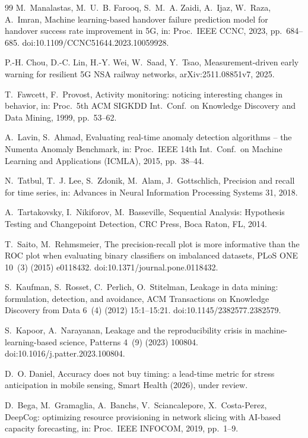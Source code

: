 \documentclass[preprint,review,12pt]{elsarticle}
\begin{document}
\begin{thebibliography}{99}
M.~Manalastas, M.~U.~B. Farooq, S.~M.~A. Zaidi, A.~Ijaz, W.~Raza, A.~Imran, Machine
learning-based handover failure prediction model for handover success rate
improvement in 5G, in: Proc.\ IEEE CCNC, 2023, pp.~684--685.
doi:10.1109/CCNC51644.2023.10059928.

P.-H. Chou, D.-C. Lin, H.-Y. Wei, W.~Saad, Y.~Tsao, Measurement-driven early warning
for resilient 5G NSA railway networks, arXiv:2511.08851v7, 2025.

T.~Fawcett, F.~Provost, Activity monitoring: noticing interesting changes in
behavior, in: Proc.\ 5th ACM SIGKDD Int.\ Conf.\ on Knowledge Discovery and Data
Mining, 1999, pp.~53--62.

A.~Lavin, S.~Ahmad, Evaluating real-time anomaly detection algorithms -- the Numenta
Anomaly Benchmark, in: Proc.\ IEEE 14th Int.\ Conf.\ on Machine Learning and
Applications (ICMLA), 2015, pp.~38--44.

N.~Tatbul, T.~J. Lee, S.~Zdonik, M.~Alam, J.~Gottschlich, Precision and recall for
time series, in: Advances in Neural Information Processing Systems 31, 2018.

A.~Tartakovsky, I.~Nikiforov, M.~Basseville, Sequential Analysis: Hypothesis Testing
and Changepoint Detection, CRC Press, Boca Raton, FL, 2014.

T.~Saito, M.~Rehmsmeier, The precision-recall plot is more informative than the ROC
plot when evaluating binary classifiers on imbalanced datasets, PLoS ONE 10~(3)
(2015) e0118432. doi:10.1371/journal.pone.0118432.

S.~Kaufman, S.~Rosset, C.~Perlich, O.~Stitelman, Leakage in data mining:
formulation, detection, and avoidance, ACM Transactions on Knowledge Discovery from
Data 6~(4) (2012) 15:1--15:21. doi:10.1145/2382577.2382579.

S.~Kapoor, A.~Narayanan, Leakage and the reproducibility crisis in
machine-learning-based science, Patterns 4~(9) (2023) 100804.
doi:10.1016/j.patter.2023.100804.

D.~O. Daniel, Accuracy does not buy timing: a lead-time metric for stress
anticipation in mobile sensing, Smart Health (2026), under review.

D.~Bega, M.~Gramaglia, A.~Banchs, V.~Sciancalepore, X.~Costa-Perez, DeepCog:
optimizing resource provisioning in network slicing with AI-based capacity
forecasting, in: Proc.\ IEEE INFOCOM, 2019, pp.~1--9.


\end{thebibliography}
\end{document}
